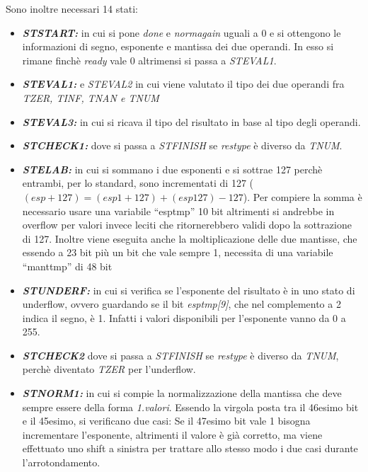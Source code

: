 \documentclass[]{IEEEtran}
\begin{document}
Sono inoltre necessari 14 stati:
\begin{itemize}
\item {\it\bf ST\textunderscore START:} in cui si pone {\it done} e {\it norm\textunderscore again} uguali a 0 e si ottengono le informazioni di segno, esponente e mantissa dei due operandi. In esso si rimane finchè {\it ready} vale 0 altrimensi si passa a {\it ST\textunderscore EVAL1}.
\item {\it\bf ST\textunderscore EVAL1:} e {\it ST\textunderscore EVAL2} in cui viene valutato il tipo dei due operandi fra {\it T\textunderscore ZER, T\textunderscore INF, T\textunderscore NAN e T\textunderscore NUM}
\item {\it\bf ST\textunderscore EVAL3:} in cui si ricava il tipo del risultato in base al tipo degli operandi.
\item {\it\bf ST\textunderscore CHECK1:} dove si passa a {\it ST\textunderscore FINISH} se {\it res\textunderscore type} è diverso da {\it T\textunderscore NUM}.
\item {\it\bf ST\textunderscore ELAB:} in cui si sommano i due esponenti e si sottrae 127 perchè entrambi, per lo standard, sono incrementati di 127 (\((esp+127) = (esp1+127)+(esp127) - 127\)). Per compiere la somma è necessario usare una variabile ``esp\textunderscore tmp'' 10 bit altrimenti si andrebbe in overflow per valori invece leciti che ritornerebbero validi dopo la sottrazione di 127. Inoltre viene eseguita anche la moltiplicazione delle due mantisse, che essendo a 23 bit più un bit che vale sempre 1, necessita di una variabile ``mant\textunderscore tmp'' di 48 bit 
\item {\it\bf ST\textunderscore UNDERF:} in cui si verifica se l'esponente del risultato è in uno stato di underflow, ovvero guardando se il bit {\it esp\textunderscore tmp[9]}, che nel complemento a 2 indica il segno, è 1. Infatti i valori disponibili per l'esponente vanno da 0 a 255.
\item {\it\bf ST\textunderscore CHECK2} dove si passa a {\it ST\textunderscore FINISH} se {\it res\textunderscore type} è diverso da {\it T\textunderscore NUM}, perchè diventato {\it T\textunderscore ZER} per l'underflow.
\item {\it\bf ST\textunderscore NORM1:} in cui si compie la normalizzazione della mantissa che deve sempre essere della forma {\it 1.valori}. Essendo la virgola posta tra il 46esimo bit e il 45esimo, si verificano due casi: Se il 47esimo bit vale 1 bisogna incrementare l'esponente, altrimenti il valore è già corretto, ma viene effettuato uno shift a sinistra per trattare allo stesso modo i due casi durante l'arrotondamento.

\end{itemize}
\end{document}
